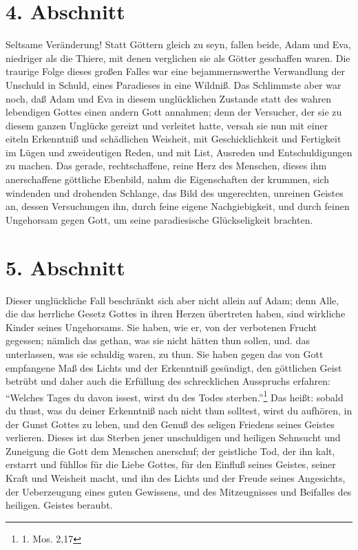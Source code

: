 \section{4. Abschnitt}

Seltsame Veränderung! Statt Göttern gleich zu seyn, fallen beide, Adam und Eva, niedriger als die Thiere, mit denen verglichen sie als Götter geschaffen waren. Die traurige Folge dieses großen Falles war eine bejammernswerthe Verwandlung der Unschuld in Schuld, eines Paradieses in eine Wildniß. Das Schlimmste aber war noch, daß Adam und Eva in diesem unglücklichen Zustande statt des wahren lebendigen Gottes einen andern Gott annahmen; denn der Versucher, der sie zu diesem ganzen Unglücke gereizt und verleitet hatte, versah sie nun mit einer eiteln Erkenntniß und schädlichen Weisheit, mit Geschicklichkeit und Fertigkeit im Lügen und zweideutigen Reden, und mit List, Ausreden und Entschuldigungen zu machen. Das gerade, rechtschaffene, reine Herz des Menschen, dieses ihm anerschaffene göttliche Ebenbild, nahm die Eigenschaften der krummen, sich windenden und drohenden Schlange, das Bild des ungerechten, unreinen Geistes an, dessen Versuchungen ihn, durch feine eigene Nachgiebigkeit, und durch feinen Ungehorsam gegen Gott, um seine paradiesische Glückseligkeit brachten.

\section{5. Abschnitt}

Dieser unglückliche Fall beschränkt sich aber nicht allein auf Adam; denn Alle, die das herrliche Gesetz Gottes in ihren Herzen übertreten haben, sind wirkliche Kinder seines Ungehorsams. Sie haben, wie er, von der verbotenen Frucht gegessen; nämlich das gethan, was sie nicht hätten thun sollen, und. das unterlassen, was sie schuldig waren, zu thun. Sie haben gegen das von Gott empfangene Maß des Lichts und der Erkenntniß gesündigt, den göttlichen Geist betrübt und daher auch die Erfüllung des schrecklichen Ausspruchs erfahren: "`Welches Tages du davon issest, wirst du des Todes sterben."'\footnote{1. Mos. 2,17} Das heißt: sobald du thust, was du deiner Erkenntniß nach nicht thun solltest, wirst du aufhören, in der Gunst Gottes zu leben, und den Genuß des seligen Friedens seines Geistes verlieren. Dieses ist das Sterben jener unschuldigen und heiligen Sehnsucht und Zuneigung die Gott dem Menschen anerschuf; der geistliche Tod, der ihn kalt, erstarrt und fühllos für die Liebe Gottes, für den Einfluß seines Geistes, seiner Kraft und Weisheit macht, und ihn des Lichts und der Freude seines Angesichts, der Ueberzeugung eines guten Gewissens, und des Mitzeugnisses und Beifalles des heiligen. Geistes beraubt.

